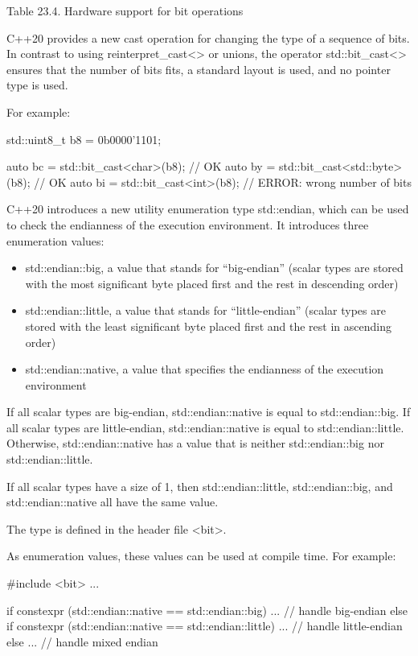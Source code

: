 \begin{center}
Table 23.4. Hardware support for bit operations
\end{center}


C++20 provides a new cast operation for changing the type of a sequence of bits. In contrast to using reinterpret\_cast<> or unions, the operator std::bit\_cast<> ensures that the number of bits fits, a standard layout is used, and no pointer type is used.

For example:

\begin{cpp}
std::uint8_t b8 = 0b0000’1101;

auto bc = std::bit_cast<char>(b8); // OK
auto by = std::bit_cast<std::byte>(b8); // OK
auto bi = std::bit_cast<int>(b8); // ERROR: wrong number of bits
\end{cpp}


C++20 introduces a new utility enumeration type std::endian, which can be used to check the endianness of the execution environment. It introduces three enumeration values:

\begin{itemize}
\item 
std::endian::big, a value that stands for “big-endian” (scalar types are stored with the most significant byte placed first and the rest in descending order)

\item 
std::endian::little, a value that stands for “little-endian” (scalar types are stored with the least significant byte placed first and the rest in ascending order)

\item 
std::endian::native, a value that specifies the endianness of the execution environment
\end{itemize}

If all scalar types are big-endian, std::endian::native is equal to std::endian::big. If all scalar types are little-endian, std::endian::native is equal to std::endian::little. Otherwise, std::endian::native has a value that is neither std::endian::big nor std::endian::little.

If all scalar types have a size of 1, then std::endian::little, std::endian::big, and std::endian::native all have the same value.

The type is defined in the header file <bit>.

As enumeration values, these values can be used at compile time. For example:

\begin{cpp}
#include <bit>
...

if constexpr (std::endian::native == std::endian::big) {
	... // handle big-endian
}
else if constexpr (std::endian::native == std::endian::little) {
	... // handle little-endian
}
else {
	... // handle mixed endian
}
\end{cpp}









